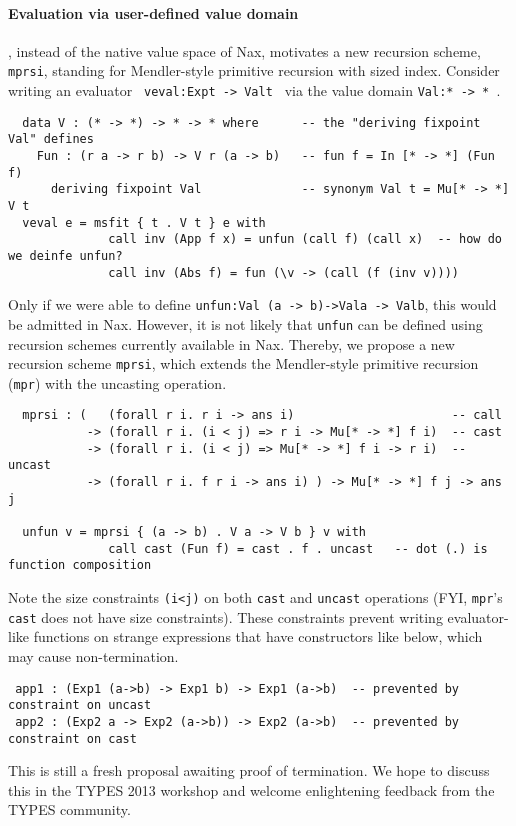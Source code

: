 \documentclass[a4paper]{easychair} %
\newcommand{\mprsi}[0]{\texttt{mprsi}}
\begin{document}
\paragraph{Evaluation via user-defined value domain\!\!\!\!\!}, instead of
the native value space of Nax, motivates a new recursion scheme,
\mprsi, standing for Mendler-style primitive recursion with sized index.
Consider writing an evaluator \texttt{\,veval\;:\;Exp\;t\,->\,Val\;t\,}
via the value domain \texttt{Val\;:\;*\,->\,*\,}.\vspace*{-1ex}
{\small
\begin{verbatim}
  data V : (* -> *) -> * -> * where      -- the "deriving fixpoint Val" defines
    Fun : (r a -> r b) -> V r (a -> b)   -- fun f = In [* -> *] (Fun f)
      deriving fixpoint Val              -- synonym Val t = Mu[* -> *] V t
  veval e = msfit { t . V t } e with
              call inv (App f x) = unfun (call f) (call x)  -- how do we deinfe unfun?
              call inv (Abs f) = fun (\v -> (call (f (inv v))))
\end{verbatim} }
\noindent
Only if we were able to define
\texttt{unfun\;:\;Val\,(a\,->\,b)\;->\;Val\;a\,->\,Val\;b},
this would be admitted in Nax.
However, it is not likely that \texttt{unfun} can be defined using
recursion schemes currently available in Nax. Thereby, we propose
a new recursion scheme \mprsi, which extends the Mendler-style primitive recursion
(\texttt{mpr}) with the uncasting operation. 
{\small
\begin{verbatim}
  mprsi : (   (forall r i. r i -> ans i)                      -- call
           -> (forall r i. (i < j) => r i -> Mu[* -> *] f i)  -- cast   
           -> (forall r i. (i < j) => Mu[* -> *] f i -> r i)  -- uncast 
           -> (forall r i. f r i -> ans i) ) -> Mu[* -> *] f j -> ans j

  unfun v = mprsi { (a -> b) . V a -> V b } v with
              call cast (Fun f) = cast . f . uncast   -- dot (.) is function composition
\end{verbatim} }
\noindent
Note the size constraints \texttt{(i\;<\;j)} on both \texttt{cast} and \texttt{uncast} operations
(FYI, \texttt{mpr}'s \texttt{cast} does not have size constraints).
These constraints prevent writing evaluator-like functions on strange expressions
that have constructors like below, which may cause non-termination.\vspace*{-.5ex}
{\small
\begin{verbatim}
 app1 : (Exp1 (a->b) -> Exp1 b) -> Exp1 (a->b)  -- prevented by constraint on uncast
 app2 : (Exp2 a -> Exp2 (a->b)) -> Exp2 (a->b)  -- prevented by constraint on cast
\end{verbatim} }\vspace*{-.5ex}
\noindent
This is still a fresh proposal awaiting proof of termination.
We hope to discuss this in the TYPES 2013 workshop and welcome
enlightening feedback from the TYPES community.
\end{document}
